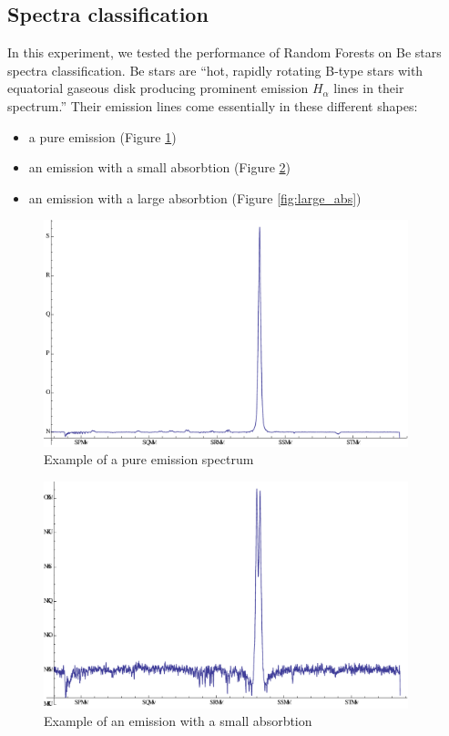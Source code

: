 \documentclass[thesis=B,english]{FITthesis}[2012/10/20]
\begin{document}
\subsection{Spectra classification}
In this experiment, we tested the performance of Random Forests on Be stars spectra classification. Be stars are ``hot, rapidly rotating B-type stars with equatorial gaseous disk producing prominent emission $H_\alpha$ lines in their spectrum.''\cite{bromovabeclass} Their emission lines come essentially in these different shapes:
\begin{itemize}
\item a pure emission (Figure \ref{fig:pure_emission})
\item an emission with a small absorbtion (Figure \ref{fig:small_abs})
\item an emission with a large absorbtion (Figure \ref{fig:large_abs})
\end{itemize}

\begin{figure}

\includegraphics[width=300pt]{emission_spectrum}
\centering
\caption{Example of a pure emission spectrum}
\label{fig:pure_emission}

\end{figure}

\begin{figure}
\centering
\includegraphics[width=300pt]{small_abs_spectrum}
\caption{Example of an emission with a small absorbtion}
\label{fig:small_abs}

\end{figure}
\end{document}
